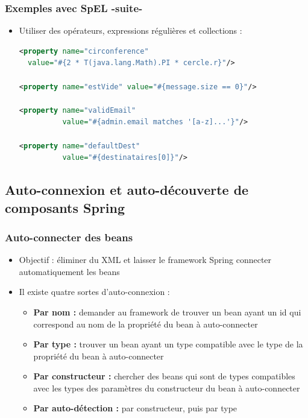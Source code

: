 \documentclass{beamer}
\begin{document}
\begin{frame}[fragile]
  \frametitle{Exemples avec SpEL -suite-}
  \begin{itemize}
\item Utiliser des opérateurs, expressions régulières et collections :
\begin{lstlisting}[language=XML,basicstyle=\scriptsize]
<property name="circonference"
  value="#{2 * T(java.lang.Math).PI * cercle.r}"/>

<property name="estVide" value="#{message.size == 0}"/>

<property name="validEmail"
          value="#{admin.email matches '[a-z]...'}"/>

<property name="defaultDest"
          value="#{destinataires[0]}"/>
\end{lstlisting}
  \end{itemize}
\end{frame}
\subsection{Auto-connexion et auto-découverte de composants Spring}
\begin{frame}
  \frametitle{Auto-connecter des beans}  
  \begin{itemize}
  \item Objectif : éliminer du XML et laisser le framework Spring
    connecter automatiquement les beans
  \item Il existe quatre sortes d'auto-connexion :
  \begin{itemize}
  \item \textbf{Par nom :} demander au framework de trouver un bean
    ayant un id qui correspond au nom de la propriété du bean à
    auto-connecter
  \item \textbf{Par type :} trouver un bean ayant un type compatible
    avec le type de la propriété du bean à auto-connecter
  \item \textbf{Par constructeur :} chercher des beans qui sont de
    types compatibles avec les types des paramètres du constructeur du
    bean à auto-connecter
  \item \textbf{Par auto-détection :} par constructeur, puis par type
  \end{itemize}  
  \end{itemize}
\end{frame}
\end{document}
